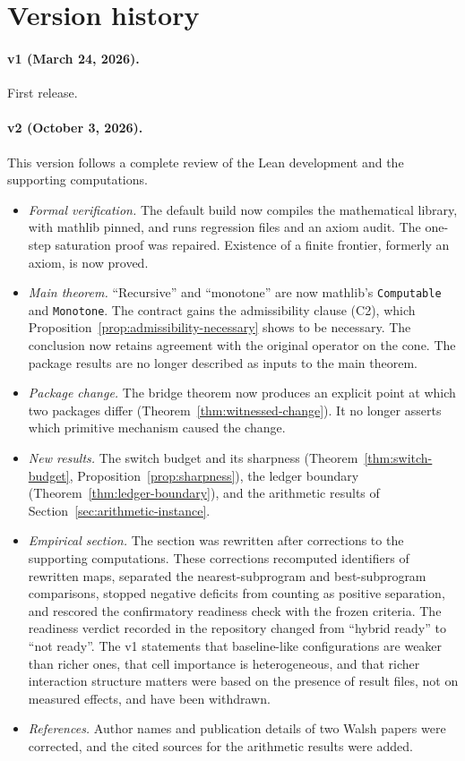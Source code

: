 \section{Version history}\label{app:version-history}

\paragraph{v1 (March 24, 2026).} First release.

\paragraph{v2 (October 3, 2026).} This version follows a complete review of the Lean development and the supporting computations.
\begin{itemize}[leftmargin=*, itemsep=2pt]
\item \emph{Formal verification.} The default build now compiles the mathematical library, with mathlib pinned, and runs regression files and an axiom audit. The one-step saturation proof was repaired. Existence of a finite frontier, formerly an axiom, is now proved.
\item \emph{Main theorem.} ``Recursive'' and ``monotone'' are now mathlib's \texttt{Computable} and \texttt{Monotone}. The contract gains the admissibility clause (C2), which Proposition~\ref{prop:admissibility-necessary} shows to be necessary. The conclusion now retains agreement with the original operator on the cone. The package results are no longer described as inputs to the main theorem.
\item \emph{Package change.} The bridge theorem now produces an explicit point at which two packages differ (Theorem~\ref{thm:witnessed-change}). It no longer asserts which primitive mechanism caused the change.
\item \emph{New results.} The switch budget and its sharpness (Theorem~\ref{thm:switch-budget}, Proposition~\ref{prop:sharpness}), the ledger boundary (Theorem~\ref{thm:ledger-boundary}), and the arithmetic results of Section~\ref{sec:arithmetic-instance}.
\item \emph{Empirical section.} The section was rewritten after corrections to the supporting computations. These corrections recomputed identifiers of rewritten maps, separated the nearest-subprogram and best-subprogram comparisons, stopped negative deficits from counting as positive separation, and rescored the confirmatory readiness check with the frozen criteria. The readiness verdict recorded in the repository changed from ``hybrid ready'' to ``not ready''. The v1 statements that baseline-like configurations are weaker than richer ones, that cell importance is heterogeneous, and that richer interaction structure matters were based on the presence of result files, not on measured effects, and have been withdrawn.
\item \emph{References.} Author names and publication details of two Walsh papers were corrected, and the cited sources for the arithmetic results were added.
\end{itemize}
